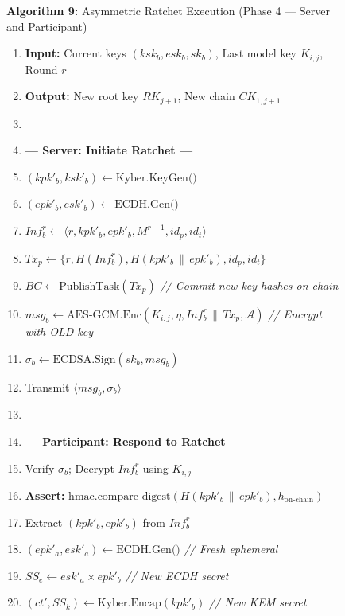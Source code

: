 \documentclass[journal, 10pt, twocolumn]{IEEEtran}
\begin{document}
\begin{figure}[!t]
\hrulefill
\vspace{-0.2cm}
\begin{center}
\textbf{Algorithm 9:} Asymmetric Ratchet Execution (Phase 4 --- Server and Participant)
\end{center}
\vspace{-0.2cm}
\hrulefill
\begin{enumerate}
    \item \textbf{Input:} Current keys $(ksk_b, esk_b, sk_b)$, Last model key $K_{i,j}$, Round $r$
    \item \textbf{Output:} New root key $RK_{j+1}$, New chain $CK_{1,j+1}$
    \item[]
    \item[] \textbf{--- Server: Initiate Ratchet ---}
    \item $(kpk'_b, ksk'_b) \leftarrow \text{Kyber.KeyGen()}$
    \item $(epk'_b, esk'_b) \leftarrow \text{ECDH.Gen()}$
    \item $Inf_b^r \leftarrow \langle r, kpk'_b, epk'_b, M^{r-1}, id_p, id_t \rangle$
    \item $Tx_p \leftarrow \{r, H(Inf_b^r), H(kpk'_b \,\|\, epk'_b), id_p, id_t\}$
    \item $BC \leftarrow \text{PublishTask}(Tx_p)$ \quad \textit{// Commit new key hashes on-chain}
    \item $msg_b \leftarrow \text{AES-GCM.Enc}(K_{i,j}, \eta, Inf_b^r \,\|\, Tx_p, \mathcal{A})$ \quad \textit{// Encrypt with OLD key}
    \item $\sigma_b \leftarrow \text{ECDSA.Sign}(sk_b, msg_b)$
    \item Transmit $\langle msg_b, \sigma_b \rangle$
    \item[]
    \item[] \textbf{--- Participant: Respond to Ratchet ---}
    \item Verify $\sigma_b$; Decrypt $Inf_b^r$ using $K_{i,j}$
    \item \textbf{Assert:} $\text{hmac.compare\_digest}(H(kpk'_b \,\|\, epk'_b), h_{\text{on-chain}})$
    \item Extract $(kpk'_b, epk'_b)$ from $Inf_b^r$
    \item $(epk'_a, esk'_a) \leftarrow \text{ECDH.Gen()}$ \quad \textit{// Fresh ephemeral}
    \item $SS_e \leftarrow esk'_a \times epk'_b$ \quad  \textit{// New ECDH secret}
    \item $(ct', SS_k) \leftarrow \text{Kyber.Encap}(kpk'_b)$ \quad \textit{// New KEM secret}

\end{enumerate}
\end{figure}
\end{document}
